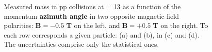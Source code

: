 \begin{figure}[!p]
\hspace*{-1.5cm}
\hspace*{-1.5cm}
\caption{Measured mass in pp collisions at \sqrtS = 13 \tev as a function of the momentum \textbf{azimuth angle} in two opposite magnetic field polarities: $\mathbf{B = -0.5}$ \textbf{T} on the left, and $\mathbf{B=+0.5}$ \textbf{T} on the right. To each row corresponds a given particle: \rmLambda (a) and (b), \rmXi in (c) and (d). The uncertainties comprise only the statistical ones.}
	\label{fig:MassVsPhiVsB}
\end{figure}

